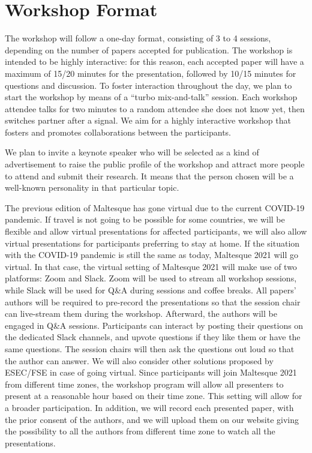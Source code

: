 
\section{Workshop Format}
\label{sec:format}

The workshop will follow a one-day format, consisting of 3 to 4 sessions, depending on the number of papers accepted for publication.
The workshop is intended to be highly interactive: for this reason, each accepted paper will have a maximum of 15/20 minutes for the presentation, followed by 10/15 minutes for questions and discussion.
To foster interaction throughout the day, we plan to start the workshop by means of a “turbo mix-and-talk” session. Each workshop attendee talks for two minutes to a random attendee she does not know yet, then switches partner after a signal. We aim for a highly interactive workshop that fosters and promotes collaborations between the participants. %

We plan to invite a keynote speaker who will be selected as a kind of advertisement to raise the public profile of the workshop and attract more people to attend and submit their research. It means that the person chosen will be a well-known personality in that particular topic. 

The previous edition of Maltesque has gone virtual due to the current COVID-19 pandemic. If travel is not going to be possible for some countries, we will be flexible and allow virtual presentations for affected participants, we will also allow virtual presentations for participants preferring to stay at home. If the situation with the COVID-19 pandemic is still the same as today, Maltesque 2021 will go virtual. In that case, the virtual setting of Maltesque 2021 will make use of two platforms: Zoom and Slack. Zoom will be used to stream all workshop sessions, while Slack will be used for Q\&A during sessions and coffee breaks. All papers' authors will be required to pre-record the presentations so that the session chair can live-stream them during the workshop. Afterward, the authors will be engaged in Q\&A sessions. Participants can interact by posting their questions on the dedicated Slack channels, and upvote questions if they like them or have the same questions. The session chairs will then ask the questions out loud so that the author can answer. We will also consider other solutions proposed by ESEC/FSE in case of going virtual.
Since participants will join Maltesque 2021 from different time zones, the workshop program will allow all presenters to present at a reasonable hour based on their time zone. This setting will allow for a broader participation. In addition, we will record each presented paper, with the prior consent of the authors, and we will upload them on our website giving the possibility to all the authors from different time zone to watch all the presentations.